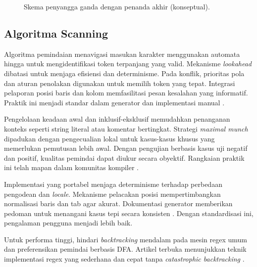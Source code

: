 \documentclass[../main.tex]{subfiles}
\begin{document}
\begin{figure}[t]
  \centering
  \caption{Skema penyangga ganda dengan penanda akhir (konseptual).}
  \label{fig:two-buffer-scheme}
\end{figure}

\subsection{Algoritma Scanning}
Algoritma pemindaian menavigasi masukan karakter menggunakan automata hingga untuk mengidentifikasi token terpanjang yang valid. Mekanisme \emph{lookahead} dibatasi untuk menjaga efisiensi dan determinisme. Pada konflik, prioritas pola dan aturan penolakan digunakan untuk memilih token yang tepat. Integrasi pelaporan posisi baris dan kolom memfasilitasi pesan kesalahan yang informatif. Praktik ini menjadi standar dalam generator dan implementasi manual \citep{FlexManual}.

Pengelolaan keadaan awal dan inklusif-eksklusif memudahkan penanganan konteks seperti string literal atau komentar bertingkat. Strategi \emph{maximal munch} dipadukan dengan pengecualian lokal untuk kasus-kasus khusus yang memerlukan pemutusan lebih awal. Dengan pengujian berbasis kasus uji negatif dan positif, kualitas pemindai dapat diukur secara obyektif. Rangkaian praktik ini telah mapan dalam komunitas kompiler \citep{Mogensen2010,FlexManual}.

Implementasi yang portabel menjaga determinisme terhadap perbedaan pengodean dan \emph{locale}. Mekanisme pelacakan posisi mempertimbangkan normalisasi baris dan tab agar akurat. Dokumentasi generator memberikan pedoman untuk menangani kasus tepi secara konsisten \citep{FlexManual}. Dengan standardisasi ini, pengalaman pengguna menjadi lebih baik.

Untuk performa tinggi, hindari \emph{backtracking} mendalam pada mesin regex umum dan preferensikan pemindai berbasis DFA. Artikel terbuka menunjukkan teknik implementasi regex yang sederhana dan cepat tanpa \emph{catastrophic backtracking} \citep{CoxRegex}.
\end{document}
